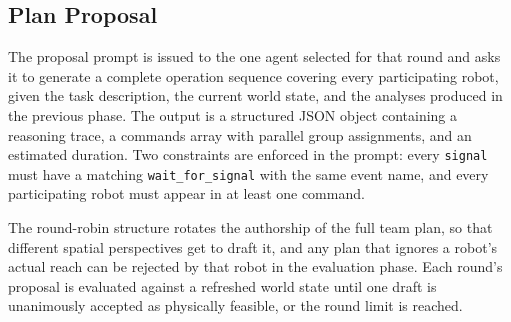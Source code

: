 \subsection{Plan Proposal}
The proposal prompt is issued to the one agent selected for that round and asks it to generate a complete operation sequence covering every participating robot, given the task description, the current world state, and the analyses produced in the previous phase. The output is a structured JSON object containing a reasoning trace, a commands array with parallel group assignments, and an estimated duration. Two constraints are enforced in the prompt: every \texttt{signal} must have a matching \texttt{wait\_for\_signal} with the same event name, and every participating robot must appear in at least one command.

The round-robin structure rotates the authorship of the full team plan, so that different spatial perspectives get to draft it, and any plan that ignores a robot's actual reach can be rejected by that robot in the evaluation phase. Each round's proposal is evaluated against a refreshed world state until one draft is unanimously accepted as physically feasible, or the round limit is reached.

